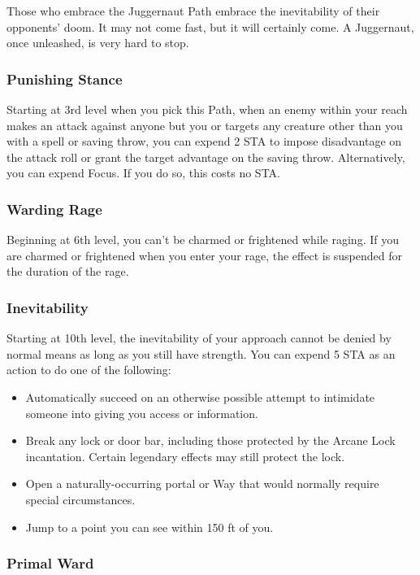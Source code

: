 Those who embrace the Juggernaut Path embrace the inevitability of their opponents' doom. It may not come fast, but it will certainly come. A Juggernaut, once unleashed, is very hard to stop.

\subsubsection{Punishing Stance}

Starting at 3rd level when you pick this Path, when an enemy within your reach makes an attack against anyone but you or targets any creature other than you with a spell or saving throw, you can expend 2 STA to impose disadvantage on the attack roll or grant the target advantage on the saving throw. Alternatively, you can expend Focus. If you do so, this costs no STA.

\subsubsection{Warding Rage}

Beginning at 6th level, you can’t be charmed or frightened while raging. If you are charmed or frightened when you enter your rage, the effect is suspended for the duration of the rage.

\subsubsection{Inevitability}

Starting at 10th level, the inevitability of your approach cannot be denied by normal means as long as you still have strength. You can expend 5 STA as an action to do one of the following:
\begin{itemize}
\item  Automatically succeed on an otherwise possible attempt to intimidate someone into giving you access or information.
\item  Break any lock or door bar, including those protected by the Arcane Lock incantation. Certain legendary effects may still protect the lock.
\item  Open a naturally-occurring portal or Way that would normally require special circumstances.
\item  Jump to a point you can see within 150 ft of you.
\end{itemize}

\subsubsection{Primal Ward}

